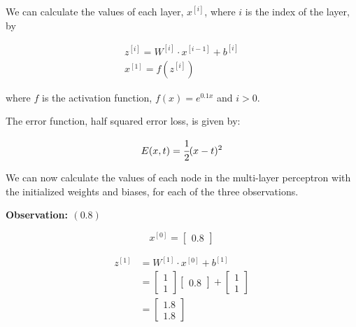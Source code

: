 \documentclass[12pt]{article}
\begin{document}
\begin{enumerate}[leftmargin=\labelsep]
          We can calculate the values of each layer, $x^{[i]}$, where $i$ is the
          index of the layer, by

          $$
              \begin{array}{c}
                  z^{[i]} = W^{[i]} \cdot x^{[i-1]} + b^{[i]} \\
                  x^{[1]} = f(z^{[i]})
              \end{array}
          $$

          where $f$ is the activation function, $f(x) = e^{0.1x}$ and $i > 0$.

          The error function, half squared error loss, is given by:

          $$
              E(x, t) = \cfrac{1}{2}(x - t)^2
          $$

          \vspace*{0.5cm}

          We can now calculate the values of each node in the multi-layer perceptron
          with the initialized weights and biases, for each of the three observations.

          \vspace*{0.5cm}

          \begin{paracol}{3}
              \begin{center}
                  \textbf{Observation: $(0.8)$}
              \end{center}

              $$
                  x^{[0]} = \begin{bmatrix}
                      0.8
                  \end{bmatrix}
              $$

              $$
                  \begin{aligned}
                      z^{[1]} & = W^{[1]} \cdot x^{[0]} + b^{[1]} \\
                              & = \begin{bmatrix}
                                      1 \\
                                      1
                                  \end{bmatrix}
                      \begin{bmatrix}
                          0.8
                      \end{bmatrix}
                      +
                      \begin{bmatrix}
                          1 \\
                          1
                      \end{bmatrix}                              \\
                              & = \begin{bmatrix}{}
                                      1.8 \\
                                      1.8
                                  \end{bmatrix}
                  \end{aligned}
              $$


\end{paracol}
\end{enumerate}
\end{document}
